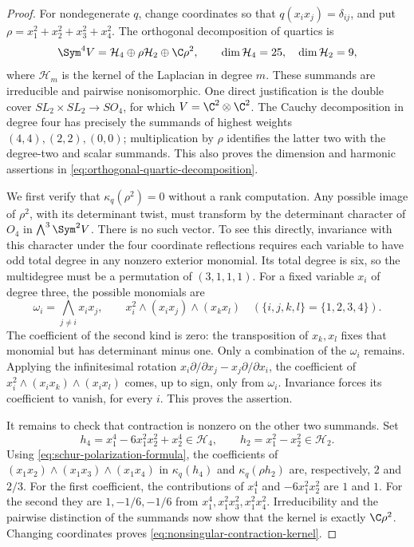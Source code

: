 \begin{proof}
For nondegenerate \(q\), change coordinates so that
\(q(x_ix_j)=\delta_{ij}\), and put
\(\rho=x_1^2+x_2^2+x_3^2+x_4^2\).
The orthogonal decomposition of quartics is
\begin{equation}\label{eq:orthogonal-quartic-decomposition}
 \Sym^4V=\mathcal H_4\oplus\rho\mathcal H_2\oplus\C\rho^2,
 \qquad \dim\mathcal H_4=25,\quad\dim\mathcal H_2=9,
\end{equation}
where \(\mathcal H_m\) is the kernel of the Laplacian in
degree \(m\).  These summands are irreducible and pairwise
nonisomorphic.  One direct justification is the double cover
\(SL_2\times SL_2\to SO_4\), for which
\(V=\C^2\otimes\C^2\).  The Cauchy decomposition in degree
four has precisely the summands of highest weights
\((4,4),(2,2),(0,0)\); multiplication by \(\rho\) identifies
the latter two with the degree-two and scalar summands.  This also
proves the dimension and harmonic assertions in
\eqref{eq:orthogonal-quartic-decomposition}.

We first verify that \(\kappa_q(\rho^2)=0\) without a
rank computation.  Any possible image of \(\rho^2\), with its
determinant twist, must transform by the determinant character of
\(O_4\) in \(\bigwedge^3\Sym^2V\).  There is no such vector.
To see this directly, invariance with this character under the four
coordinate reflections requires each variable to have odd total
degree in any nonzero exterior monomial.  Its total degree is six,
so the multidegree must be a permutation of \((3,1,1,1)\).
For a fixed variable \(x_i\) of degree three, the possible
monomials are
\[
 \omega_i=\bigwedge_{j\ne i}x_ix_j,
 \qquad x_i^2\wedge(x_ix_j)\wedge(x_kx_l)
       \quad(\{i,j,k,l\}=\{1,2,3,4\}).
\]
The coefficient of the second kind is zero: the transposition of
\(x_k,x_l\) fixes that monomial but has determinant minus one.
Only a combination of the \(\omega_i\) remains.  Applying the
infinitesimal rotation
\(x_i\partial/\partial x_j-x_j\partial/\partial x_i\),
the coefficient of
\(x_i^2\wedge(x_ix_k)\wedge(x_ix_l)\) comes, up to sign,
only from \(\omega_i\).  Invariance forces its coefficient to
vanish, for every \(i\).  This proves the assertion.

It remains to check that contraction is nonzero on the other two
summands.  Set
\[
 h_4=x_1^4-6x_1^2x_2^2+x_2^4\in\mathcal H_4,
 \qquad h_2=x_1^2-x_2^2\in\mathcal H_2.
\]
Using \eqref{eq:schur-polarization-formula}, the coefficients of
\((x_1x_2)\wedge(x_1x_3)\wedge(x_1x_4)\) in
\(\kappa_q(h_4)\) and \(\kappa_q(\rho h_2)\) are,
respectively, \(2\) and \(2/3\).
For the first coefficient, the contributions of \(x_1^4\)
and \(-6x_1^2x_2^2\) are \(1\) and \(1\).
For the second they are \(1,-1/6,-1/6\) from
\(x_1^4,x_1^2x_3^2,x_1^2x_4^2\).
Irreducibility and the pairwise distinction of the summands now
show that the kernel is exactly \(\C\rho^2\).
Changing coordinates proves
\eqref{eq:nonsingular-contraction-kernel}.
\end{proof}

